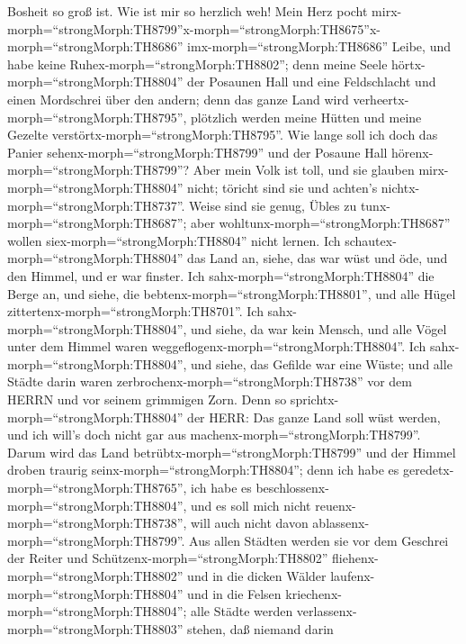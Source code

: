 Bosheit so groß ist.  Wie ist mir so herzlich weh! Mein
Herz pocht
mirx-morph=``strongMorph:TH8799''\textbar x-morph=``strongMorph:TH8675''x-morph=``strongMorph:TH8686''
imx-morph=``strongMorph:TH8686'' Leibe, und habe keine
Ruhex-morph=``strongMorph:TH8802''; denn meine Seele
hörtx-morph=``strongMorph:TH8804'' der Posaunen Hall und eine
Feldschlacht  und einen Mordschrei über den andern; denn
das ganze Land wird verheertx-morph=``strongMorph:TH8795'', plötzlich
werden meine Hütten und meine Gezelte
verstörtx-morph=``strongMorph:TH8795''.  Wie lange soll ich
doch das Panier sehenx-morph=``strongMorph:TH8799'' und der Posaune Hall
hörenx-morph=``strongMorph:TH8799''?  Aber mein Volk ist
toll, und sie glauben mirx-morph=``strongMorph:TH8804'' nicht; töricht
sind sie und achten's nichtx-morph=``strongMorph:TH8737''. Weise sind
sie genug, Übles zu tunx-morph=``strongMorph:TH8687''; aber
wohltunx-morph=``strongMorph:TH8687'' wollen
siex-morph=``strongMorph:TH8804'' nicht lernen.  Ich
schautex-morph=``strongMorph:TH8804'' das Land an, siehe, das war wüst
und öde, und den Himmel, und er war finster.  Ich
sahx-morph=``strongMorph:TH8804'' die Berge an, und siehe, die
bebtenx-morph=``strongMorph:TH8801'', und alle Hügel
zittertenx-morph=``strongMorph:TH8701''.  Ich
sahx-morph=``strongMorph:TH8804'', und siehe, da war kein Mensch, und
alle Vögel unter dem Himmel waren
weggeflogenx-morph=``strongMorph:TH8804''.  Ich
sahx-morph=``strongMorph:TH8804'', und siehe, das Gefilde war eine
Wüste; und alle Städte darin waren
zerbrochenx-morph=``strongMorph:TH8738'' vor dem HERRN und vor seinem
grimmigen Zorn.  Denn so
sprichtx-morph=``strongMorph:TH8804'' der HERR: Das ganze Land soll wüst
werden, und ich will's doch nicht gar aus
machenx-morph=``strongMorph:TH8799''.  Darum wird das Land
betrübtx-morph=``strongMorph:TH8799'' und der Himmel droben traurig
seinx-morph=``strongMorph:TH8804''; denn ich habe es
geredetx-morph=``strongMorph:TH8765'', ich habe es
beschlossenx-morph=``strongMorph:TH8804'', und es soll mich nicht
reuenx-morph=``strongMorph:TH8738'', will auch nicht davon
ablassenx-morph=``strongMorph:TH8799''.  Aus allen Städten
werden sie vor dem Geschrei der Reiter und
Schützenx-morph=``strongMorph:TH8802''
fliehenx-morph=``strongMorph:TH8802'' und in die dicken Wälder
laufenx-morph=``strongMorph:TH8804'' und in die Felsen
kriechenx-morph=``strongMorph:TH8804''; alle Städte werden
verlassenx-morph=``strongMorph:TH8803'' stehen, daß niemand darin
